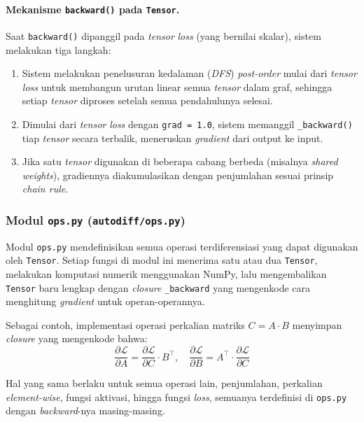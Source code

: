 \paragraph{Mekanisme \texttt{backward()} pada \texttt{Tensor}.}
Saat \texttt{backward()} dipanggil pada \textit{tensor} \textit{loss} (yang bernilai skalar), sistem melakukan tiga langkah:

\begin{enumerate}
    \item Sistem melakukan penelusuran kedalaman (\textit{DFS}) \textit{post-order} mulai dari \textit{tensor} \textit{loss} untuk membangun urutan linear semua \textit{tensor} dalam graf, sehingga setiap \textit{tensor} diproses setelah semua pendahulunya selesai.
    \item Dimulai dari \textit{tensor} \textit{loss} dengan \texttt{grad = 1.0}, sistem memanggil \texttt{\_backward()} tiap \textit{tensor} secara terbalik, meneruskan \textit{gradient} dari output ke input.
    \item Jika satu \textit{tensor} digunakan di beberapa cabang berbeda (misalnya \textit{shared weights}), gradiennya diakumulasikan dengan penjumlahan sesuai prinsip \textit{chain rule}.
\end{enumerate}

\subsubsection{Modul \texttt{ops.py} (\texttt{autodiff/ops.py})}

Modul \texttt{ops.py} mendefinisikan semua operasi terdiferensiasi yang dapat digunakan oleh \texttt{Tensor}. Setiap fungsi di modul ini menerima satu atau dua \texttt{Tensor}, melakukan komputasi numerik menggunakan NumPy, lalu mengembalikan \texttt{Tensor} baru lengkap dengan \textit{closure} \texttt{\_backward} yang mengenkode cara menghitung \textit{gradient} untuk operan-operannya.

Sebagai contoh, implementasi operasi perkalian matriks $C = A \cdot B$ menyimpan \textit{closure} yang mengenkode bahwa:
\begin{equation}
    \frac{\partial \mathcal{L}}{\partial A} = \frac{\partial \mathcal{L}}{\partial C} \cdot B^\top, \quad
    \frac{\partial \mathcal{L}}{\partial B} = A^\top \cdot \frac{\partial \mathcal{L}}{\partial C}
\end{equation}

Hal yang sama berlaku untuk semua operasi lain, penjumlahan, perkalian \textit{element-wise}, fungsi aktivasi, hingga fungsi \textit{loss}, semuanya terdefinisi di \texttt{ops.py} dengan \textit{backward}-nya masing-masing.

